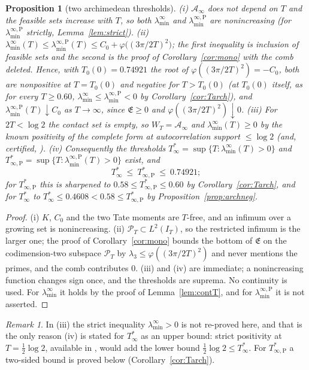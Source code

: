 \documentclass[11pt]{amsart}
\newtheorem{proposition}[theorem]{Proposition}
\theoremstyle{definition}
\theoremstyle{remark}
\newtheorem{remark}[theorem]{Remark}
\newcommand{\PT}{\mathcal P_T}
\newcommand{\IT}{I_T}
\newcommand{\Lev}{\mathfrak E}
\newcommand{\Ainf}{\mathcal A_\infty}
\newcommand{\laminf}{\lambda^{\infty}_{\min}}
\newcommand{\laminfP}{\lambda^{\infty,\mathrm P}_{\min}}
\begin{document}
\begin{proposition}[two archimedean thresholds]\label{prop:arch}
\emph{(i)} $\Ainf$ does not depend on $T$ and the feasible sets increase with $T$, so both
$\laminf$ and $\laminfP$ are nonincreasing (for $\laminfP$ strictly, Lemma~\ref{lem:strict}).
\emph{(ii)} $\laminf(T)\le\laminfP(T)\le C_0+\varphi\big((3\pi/2T)^2\big)$; the first inequality is
inclusion of feasible sets and the second is the proof of Corollary~\ref{cor:mono} with the comb deleted. Hence, with
$T_0(0)=0.74921$ the root of $\varphi((3\pi/2T)^2)=-C_0$, both are nonpositive at $T=T_0(0)$ and negative for $T>T_0(0)$ (at $T_0(0)$
itself, as for every $T\ge0.60$, $\laminf\le\laminfP<0$ by Corollary~\ref{cor:Tarch}), and $\laminfP(T)\downarrow C_0$ as
$T\to\infty$, since $\Lev\ge0$ and $\varphi((3\pi/2T)^2)\downarrow0$.
\emph{(iii)} For $2T<\log2$ the contact set is empty, so $W_T=\Ainf$ and $\laminf(T)\ge0$ by the
known positivity of the complete form at autocorrelation support $\le\log2$
\textup{\cite{Yoshida1992,Bombieri2000}} (and, certified, \cite[Thm.~1.2]{Zhu2026}).
\emph{(iv)} Consequently the thresholds
$T^*_\infty=\sup\{T:\laminf(T)>0\}$ and $T^*_{\infty,\mathrm P}=\sup\{T:\laminfP(T)>0\}$ exist, and
\[
T^*_\infty\ \le\ T^*_{\infty,\mathrm P}\ \le\ 0.74921 ;
\]
for $T^*_{\infty,\mathrm P}$ this is sharpened to $0.58\le T^*_{\infty,\mathrm P}\le0.60$ by
Corollary~\ref{cor:Tarch}, and for $T^*_\infty$ to $T^*_\infty\le0.4608<0.58\le T^*_{\infty,\mathrm P}$ by
Proposition~\ref{prop:archneg}.
\end{proposition}
\begin{proof}
(i) $K$, $C_0$ and the two Tate moments are $T$-free, and an infimum over a growing set is
nonincreasing. (ii) $\PT\subset L^2(\IT)$, so the restricted infimum is the larger one; the proof of
Corollary~\ref{cor:mono} bounds the bottom of $\Lev$ on the codimension-two subspace $\PT$ by
$\lambda_3\le\varphi((3\pi/2T)^2)$ and never mentions the primes, and the comb contributes $0$.
(iii) and (iv) are immediate; a nonincreasing function changes sign once, and the thresholds are
suprema. No continuity is used. For $\laminf$ it holds by the proof of Lemma~\ref{lem:contT}, and for
$\laminfP$ it is not asserted.
\end{proof}
\begin{remark}
In (iii) the strict inequality $\laminf>0$ is not re-proved here, and that is the only reason
(iv) is stated for $T^*_\infty$ as an upper bound: strict positivity at $T=\frac12\log2$,
available in \cite{Yoshida1992}, would add the lower bound $\frac12\log2\le T^*_\infty$. For
$T^*_{\infty,\mathrm P}$ a two-sided bound is proved below (Corollary~\ref{cor:Tarch}).
\end{remark}
\end{document}
